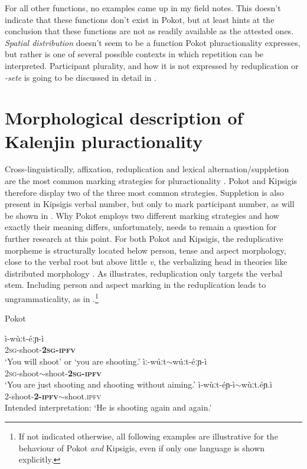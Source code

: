 \documentclass[output=paper,colorlinks,citecolor=brown
]{langscibook}
\begin{document}
\noindent For all other functions, no examples came up in my field notes. This doesn't indicate that these functions don't exist in Pokot, but at least hints at the conclusion that these functions are not as readily available as the attested ones. \textit{Spatial distribution} doesn't seem to be a function Pokot pluractionality expresses, but rather is one of several possible contexts in which repetition can be interpreted. Participant plurality, and how it is not expressed by reduplication or \textit{-sete} is going to be discussed in detail in .



\section{Morphological description of Kalenjin pluractionality}\label{sec:fiebig:morphKal}

Cross-linguistically, affixation, reduplication and lexical alternation/suppletion are the most common marking strategies for pluractionality \citet[65]{Mattiola2019}. Pokot and Kipsigis therefore display two of the three most common strategies. Suppletion is also present in Kipsigis verbal number, but only to mark participant number, as will be shown in . Why Pokot employs two different marking strategies and how exactly their meaning differs, unfortunately, needs to remain a question for further research at this point.
For both Pokot and Kipsigis, the reduplicative morpheme is structurally located below person, tense and aspect morphology, close to the verbal root but above little \textit{v}, the verbalizing head in theories like distributed morphology \citep{DM}. As  illustrates, reduplication only targets the verbal stem.  Including person and aspect marking in the reduplication leads to ungrammaticality, as in .\footnote{If not indicated otherwise, all following examples are illustrative for the behaviour of Pokot \textit{and} Kipsigis, even if only one language is shown explicitly.}


\ea Pokot  \label{ex:fiebig:PokSize}
\begin{xlist}
\ex
\gll ì-wùːt-éːɲ-ì\\
\textsc{2sg}-shoot-\textbf{\textsc{2sg-ipfv}}\\
\glt `You will shoot' or `you are shooting.'
\ex \label{ex:fiebig:correct}
\gll ìː-wúːt$\sim$wúːt-éːɲ-ì\\
\textsc{2sg}-shoot$\sim$shoot-\textbf{\textsc{2sg-ipfv}}\\
\glt `You are just shooting and shooting without aiming.' 
\ex \label{ex:fiebig:incorrect}
\gll *ì-wùːt-éɲ-ì$\sim$wùːt.éɲ.ì\\
2-shoot-\textbf{2-\textsc{ipfv}}$\sim$shoot.\textsc{ipfv}\\
\glt Intended interpretation: `He is shooting again and again.' 
\end{xlist}
\z
\end{document}

